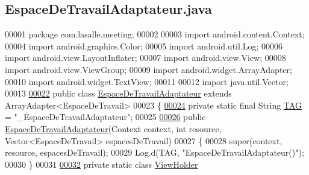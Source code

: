 \hypertarget{_espace_de_travail_adaptateur_8java_source}{}\subsection{Espace\+De\+Travail\+Adaptateur.\+java}
\label{_espace_de_travail_adaptateur_8java_source}

\begin{DoxyCode}
00001 \textcolor{keyword}{package }com.lasalle.meeting;
00002 
00003 \textcolor{keyword}{import} android.content.Context;
00004 \textcolor{keyword}{import} android.graphics.Color;
00005 \textcolor{keyword}{import} android.util.Log;
00006 \textcolor{keyword}{import} android.view.LayoutInflater;
00007 \textcolor{keyword}{import} android.view.View;
00008 \textcolor{keyword}{import} android.view.ViewGroup;
00009 \textcolor{keyword}{import} android.widget.ArrayAdapter;
00010 \textcolor{keyword}{import} android.widget.TextView;
00011 
00012 \textcolor{keyword}{import} java.util.Vector;
00013 
\hyperlink{classcom_1_1lasalle_1_1meeting_1_1_espace_de_travail_adaptateur}{00022} \textcolor{keyword}{public} \textcolor{keyword}{class }\hyperlink{classcom_1_1lasalle_1_1meeting_1_1_espace_de_travail_adaptateur}{EspaceDeTravailAdaptateur} \textcolor{keyword}{extends} ArrayAdapter<EspaceDeTravail>
00023 \{
\hyperlink{classcom_1_1lasalle_1_1meeting_1_1_espace_de_travail_adaptateur_a6d9fb5167546f9b1da395ca3ce3a577f}{00024}     \textcolor{keyword}{private} \textcolor{keyword}{static} \textcolor{keyword}{final} String \hyperlink{classcom_1_1lasalle_1_1meeting_1_1_espace_de_travail_adaptateur_a6d9fb5167546f9b1da395ca3ce3a577f}{TAG} = \textcolor{stringliteral}{"\_EspaceDeTravailAdaptateur"};
00025 
\hyperlink{classcom_1_1lasalle_1_1meeting_1_1_espace_de_travail_adaptateur_a236d4cbea7b551e4faf638b578c1f980}{00026}     \textcolor{keyword}{public} \hyperlink{classcom_1_1lasalle_1_1meeting_1_1_espace_de_travail_adaptateur_a236d4cbea7b551e4faf638b578c1f980}{EspaceDeTravailAdaptateur}(Context context, \textcolor{keywordtype}{int} resource, 
      Vector<EspaceDeTravail> espacesDeTravail)
00027     \{
00028         super(context, resource, espacesDeTravail);
00029         Log.d(TAG, \textcolor{stringliteral}{"EspaceDeTravailAdaptateur()"});
00030     \}
00031 
\hyperlink{classcom_1_1lasalle_1_1meeting_1_1_espace_de_travail_adaptateur_1_1_view_holder}{00032}     \textcolor{keyword}{private} \textcolor{keyword}{static} \textcolor{keyword}{class }\hyperlink{classcom_1_1lasalle_1_1meeting_1_1_espace_de_travail_adaptateur_1_1_view_holder}{ViewHolder}

\end{DoxyCode}
